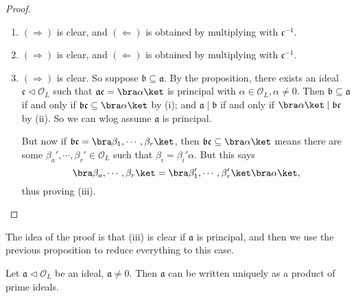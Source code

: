 \documentclass[a4paper]{article}
\begin{document}
\begin{proof}\leavevmode
  \begin{enumerate}
    \item $(\Rightarrow)$ is clear, and $(\Leftarrow)$ is obtained by multiplying with $\mathfrak{c}^{-1}$.
    \item $(\Rightarrow)$ is clear, and $(\Leftarrow)$ is obtained by multiplying with $\mathfrak{c}^{-1}$.
    \item $(\Rightarrow)$ is clear. So suppose $\mathfrak{b} \subseteq \mathfrak{a}$. By the proposition, there exists an ideal $\mathfrak{c} \lhd \mathcal{O}_L$ such that $\mathfrak{a}\mathfrak{c} = \bra \alpha\ket$ is principal with $\alpha \in \mathcal{O}_L, \alpha \not= 0$. Then $\mathfrak{b}\subseteq \mathfrak{a}$ if and only if $\mathfrak{b}\mathfrak{c} \subseteq \bra \alpha\ket$ by (i); and $\mathfrak{a} \mid \mathfrak{b}$ if and only if $\bra \alpha\ket \mid \mathfrak{b}\mathfrak{c}$ by (ii). So we can wlog assume $\mathfrak{a}$ is principal.

      But now if $\mathfrak{b}\mathfrak{c} = \bra \beta_1, \cdots, \beta_r\ket$, then $\mathfrak{b}\mathfrak{c} \subseteq \bra \alpha\ket$ means there are some $\beta_a', \cdots, \beta_r' \in \mathcal{O}_L$ such that $\beta_i = \beta_i' \alpha$. But this says
      \[
        \bra \beta_a, \cdots, \beta_r\ket = \bra \beta_1', \cdots, \beta_r' \ket \bra \alpha\ket,
      \]
      thus proving (iii).
  \end{enumerate}
\end{proof}
The idea of the proof is that (iii) is clear if $\mathfrak{a}$ is principal, and then we use the previous proposition to reduce everything to this case.

\begin{thm}
  Let $\mathfrak{a} \lhd \mathcal{O}_L$ be an ideal, $\mathfrak{a} \not= 0$. Then $\mathfrak{a}$ can be written uniquely as a product of prime ideals.
\end{thm}
\end{document}
